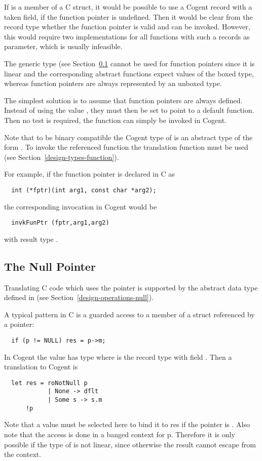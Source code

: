If  is a member of a C struct, it would be possible to use a Cogent record with a taken field,
if the function pointer is undefined. Then it would be clear from the record type whether the function pointer
is valid and can be invoked. However, this would require two implementations for all functions with such a records 
as parameter, which is usually infeasible.

The generic type  (see Section~\ref{app-trans-null} cannot be used for function pointers since
it is linear and the corresponding abstract functions expect values of the boxed type, whereas function pointers
are always represented by an unboxed type.

The simplest solution is to assume that function pointers are always defined. Instead of using the value 
, they must then be set to point to a default function. Then no test is required, the function
can simply be invoked in Cogent.

Note that to be binary compatible the Cogent type of  is an abstract type of the form .
To invoke the referenced function the translation function  must be used (see 
Section~\ref{design-types-function}). 

For example, if the function pointer is declared in C as 
\begin{verbatim}
  int (*fptr)(int arg1, const char *arg2);
\end{verbatim}
the corresponding invocation in Cogent would be
\begin{verbatim}
  invkFunPtr (fptr,arg1,arg2)
\end{verbatim}
with result type .

\subsection{The Null Pointer}
\label{app-trans-null}

Translating C code which uses the  pointer is supported by the abstract data type  defined
in  (see Section~\ref{design-operations-null}).

A typical pattern in C is a guarded access to a member of a struct referenced by a pointer:
\begin{verbatim}
  if (p != NULL) res = p->m;
\end{verbatim}
In Cogent the value  has type  where  is the record type with field . 
Then a translation to Cogent is
\begin{verbatim}
  let res = roNotNull p 
            | None -> dflt
            | Some s -> s.m
      !p
\end{verbatim}
Note that a value  must be selected here to bind it to res if the pointer is . Also note that the access is
done in a banged context for p. Therefore it is only possible if the type of  is not linear, since otherwise the result
cannot escape from the context.

